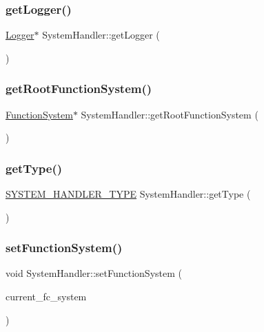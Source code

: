 \subsubsection{\texorpdfstring{get\+Logger()}{getLogger()}}
{\footnotesize\ttfamily \hyperlink{classLogger}{Logger}$\ast$ System\+Handler\+::get\+Logger (\begin{DoxyParamCaption}{ }\end{DoxyParamCaption})}

\mbox{\label{classSystemHandler_acecab58c51aa620942f4364f5a42a21c}} 
\subsubsection{\texorpdfstring{get\+Root\+Function\+System()}{getRootFunctionSystem()}}
{\footnotesize\ttfamily \hyperlink{classFunctionSystem}{Function\+System}$\ast$ System\+Handler\+::get\+Root\+Function\+System (\begin{DoxyParamCaption}{ }\end{DoxyParamCaption})}

\mbox{\label{classSystemHandler_a7d5df891633958f20c66e8046019bdcb}} 
\subsubsection{\texorpdfstring{get\+Type()}{getType()}}
{\footnotesize\ttfamily \hyperlink{statics_8h_a28f867553077bc713fdf8921a9226e2e}{S\+Y\+S\+T\+E\+M\+\_\+\+H\+A\+N\+D\+L\+E\+R\+\_\+\+T\+Y\+PE} System\+Handler\+::get\+Type (\begin{DoxyParamCaption}{ }\end{DoxyParamCaption})}

\mbox{\label{classSystemHandler_af27b9410a75ac02dff13b045afdff038}} 
\subsubsection{\texorpdfstring{set\+Function\+System()}{setFunctionSystem()}}
{\footnotesize\ttfamily void System\+Handler\+::set\+Function\+System (\begin{DoxyParamCaption}\item[{\hyperlink{classFunctionSystem}{Function\+System} $\ast$}]{current\+\_\+fc\+\_\+system }\end{DoxyParamCaption})}



